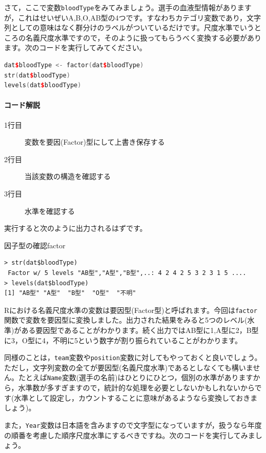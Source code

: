 \documentclass{ltjsbook}
\begin{document}
さて，ここで変数\verb|bloodType|をみてみましょう。選手の血液型情報がありますが，これはせいぜいA,B,O,AB型の4つです。すなわちカテゴリ変数であり，文字列としての意味はなく群分けのラベルがついているだけです。尺度水準でいうところの名義尺度水準ですので，そのように扱ってもらうべく変換する必要があります。次のコードを実行してみてください。


\begin{lstlisting}[language=c++,label={code:4_02},caption={Factor型に変換する}]
dat$bloodType <- factor(dat$bloodType)
str(dat$bloodType)
levels(dat$bloodType)
\end{lstlisting}
    
\paragraph{コード解説}
\begin{description}
    \item[1行目] 変数を要因(Factor)型にして上書き保存する
    \item[2行目] 当該変数の構造を確認する
    \item[3行目] 水準を確認する 
\end{description}

実行すると次のように出力されるはずです。
\begin{Rscreen}{因子型の確認}{factor}
\begin{verbatim}
> str(dat$bloodType)
 Factor w/ 5 levels "AB型","A型","B型",..: 4 2 4 2 5 3 2 3 1 5 ....
> levels(dat$bloodType)
[1] "AB型" "A型"  "B型"  "O型"  "不明"
\end{verbatim}
\end{Rscreen}
Rにおける名義尺度水準の変数は要因型(Factor型)と呼ばれます。今回は\verb|factor|関数で変数を要因型に変換しました。出力された結果をみると5つのレベル(水準)がある要因型であることがわかります。続く出力ではAB型に1,A型に2，B型に3，O型に4，不明に5という数字が割り振られていることがわかります。

同様のことは，\verb|team|変数や\verb|position|変数に対してもやっておくと良いでしょう。ただし，文字列変数の全てが要因型(名義尺度水準)であるとしなくても構いません。たとえば\verb|Name|変数(選手の名前)はひとりにひとつ，個別の水準がありますから，水準数が多すぎますので，統計的な処理を必要としないかもしれないからです(水準として設定し，カウントすることに意味があるようなら変換しておきましょう)。

また，\verb|Year|変数は日本語を含みますので文字型になっていますが，扱うなら年度の順番を考慮した順序尺度水準にするべきですね。次のコードを実行してみましょう。
\end{document}
